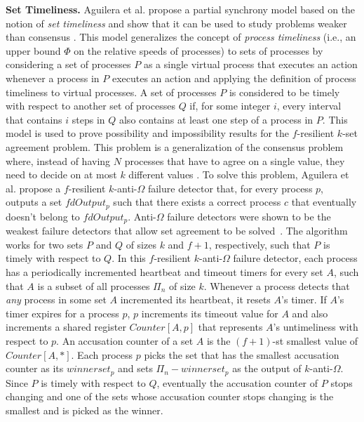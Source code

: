 \textbf{Set Timeliness.} Aguilera et al. propose a partial synchrony model based on the notion of \textit{set timeliness} and show that it can be used to study problems weaker than consensus \cite{Aguilera2012}. This model generalizes the concept of \textit{process timeliness} (i.e., an upper bound $\Phi$ on the relative speeds of processes) \cite{Dwork1988} to sets of processes by considering a set of processes $P$ as a single virtual process that executes an action whenever a process in $P$ executes an action and applying the definition of process timeliness to virtual processes. A set of processes $P$ is considered to be timely with respect to another set of processes $Q$ if, for some integer $i$, every interval that contains $i$ steps in $Q$ also contains at least one step of a process in $P$. This model is used to prove possibility and impossibility results for the $f$-resilient $k$-set agreement problem. This problem is a generalization of the consensus problem where, instead of having $N$ processes that have to agree on a single value, they need to decide on at most $k$ different values \cite{Chaudhuri1993}. To solve this problem, Aguilera et al. propose a $f$-resilient $k$-anti-$\Omega$ failure detector that, for every process $p$, outputs a set $fdOutput_p$ such that there exists a correct process $c$ that eventually doesn't belong to $fdOutput_p$. Anti-$\Omega$ failure detectors were shown to be the weakest failure detectors that allow set agreement to be solved~\cite{Zielinski2008}. The algorithm works for two sets $P$ and $Q$ of sizes $k$ and $f+1$, respectively, such that $P$ is timely with respect to $Q$. In this $f$-resilient $k$-anti-$\Omega$ failure detector, each process has a periodically incremented heartbeat and timeout timers for every set $A$, such that $A$ is a subset of all processes $\Pi_n$ of size $k$. Whenever a process detects that \textit{any} process in some set $A$ incremented its heartbeat, it resets $A$'s timer. If $A$'s timer expires for a process $p$, $p$ increments its timeout value for $A$ and also increments a shared register $Counter[A,p]$ that represents $A$'s untimeliness with respect to $p$. An accusation counter of a set $A$ is the $(f+1)$-st smallest value of $Counter[A,*]$. Each process $p$ picks the set that has the smallest accusation counter as its $winnerset_p$ and sets $\Pi_n - winnerset_p$ as the output of $k$-anti-$\Omega$. Since $P$ is timely with respect to $Q$, eventually the accusation counter of $P$ stops changing and one of the sets whose accusation counter stops changing is the smallest and is picked as the winner. \par

